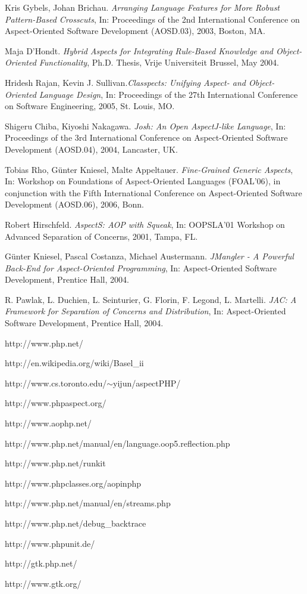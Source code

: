 \documentclass{acm_proc_article-sp}
\begin{document}
\begin{thebibliography}{}
Kris Gybels, Johan Brichau. \emph{Arranging Language Features for More Robust Pattern-Based Crosscuts}, In: Proceedings of the 2nd International Conference on Aspect-Oriented Software Development (AOSD.03), 2003, Boston, MA.

Maja D'Hondt. \emph{Hybrid Aspects for Integrating Rule-Based Knowledge and Object-Oriented Functionality}, Ph.D. Thesis, Vrije Universiteit Brussel, May 2004.

Hridesh Rajan, Kevin J. Sullivan.\emph{Classpects: Unifying Aspect- and Object-Oriented Language Design}, In: Proceedings of the 27th International Conference on Software Engineering, 2005, St. Louis, MO.

Shigeru Chiba, Kiyoshi Nakagawa. \emph{Josh: An Open AspectJ-like Language}, In: Proceedings of the 3rd International Conference on Aspect-Oriented Software Development (AOSD.04), 2004, Lancaster, UK.

Tobias Rho, G{\"u}nter Kniesel, Malte Appeltauer. \emph{Fine-Grained Generic Aspects}, In: Workshop on Foundations of Aspect-Oriented Languages (FOAL'06), in conjunction with the Fifth International Conference on Aspect-Oriented Software Development (AOSD.06), 2006, Bonn.

Robert Hirschfeld. \emph{AspectS: AOP with Squeak}, In: OOPSLA'01 Workshop on Advanced Separation of Concerns, 2001, Tampa, FL.

G{\"u}nter Kniesel, Pascal Costanza, Michael Austermann. \emph{JMangler - A Powerful Back-End for Aspect-Oriented Programming}, In: Aspect-Oriented Software Development, Prentice Hall, 2004.

R. Pawlak, L. Duchien, L. Seinturier, G. Florin, F. Legond, L. Martelli. \emph{JAC: A Framework for Separation of Concerns and Distribution}, In: Aspect-Oriented Software Development, Prentice Hall, 2004.

http://www.php.net/

http://en.wikipedia.org/wiki/Basel\_ii

http://www.cs.toronto.edu/$\sim$yijun/aspectPHP/

http://www.phpaspect.org/

http://www.aophp.net/

http://www.php.net/manual/en/language.oop5.reflection.php

http://www.php.net/runkit

http://www.phpclasses.org/aopinphp

http://www.php.net/manual/en/streams.php

http://www.php.net/debug\_backtrace

http://www.phpunit.de/

http://gtk.php.net/

http://www.gtk.org/

\end{thebibliography}
\end{document}
